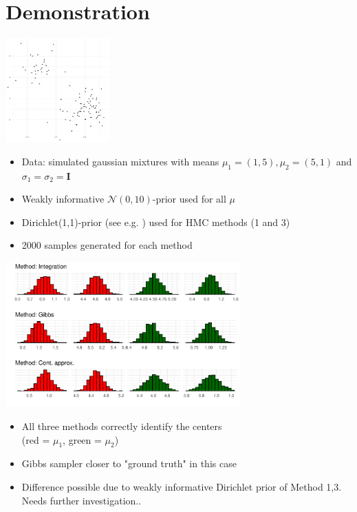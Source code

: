\documentclass[10pt]{beamer}
\begin{document}

\section{Demonstration}
\frame{\sectionpage}

\begin{frame}
	\centering
	\includegraphics[width=4cm]{figs/data.pdf}
	\begin{itemize}
		\item Data: simulated gaussian mixtures with means $\mu_1 = (1,5), \mu_2 = (5,1)$ and $\sigma_1 = \sigma_2 = \mathbf{I}$
		\item Weakly informative $\mathcal{N}(0, 10)$-prior used for all $\mu$
		\item Dirichlet(1,1)-prior (see e.g. \cite[p.~69]{bda}) used for HMC methods (1 and 3)
		\item 2000 samples generated for each method
	\end{itemize}
\end{frame}

\begin{frame}
	\centering
	\includegraphics[width=9cm]{figs/means.pdf}
	\begin{itemize}
		\item All three methods correctly identify the centers\\ (red = $\mu_1$, green = $\mu_2$)
		\item Gibbs sampler closer to "ground truth" in this case
		\item Difference possible due to weakly informative Dirichlet prior of Method 1,3. Needs further investigation..
	\end{itemize}
\end{frame}
\end{document}
